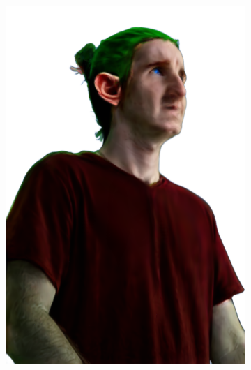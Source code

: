 \begin{figure}
\begin{subfigure}{0.18\linewidth}
        \includegraphics[width=\textwidth]{Figures/failed/igs2gs/21_render.png}

\end{subfigure}
\end{figure}
